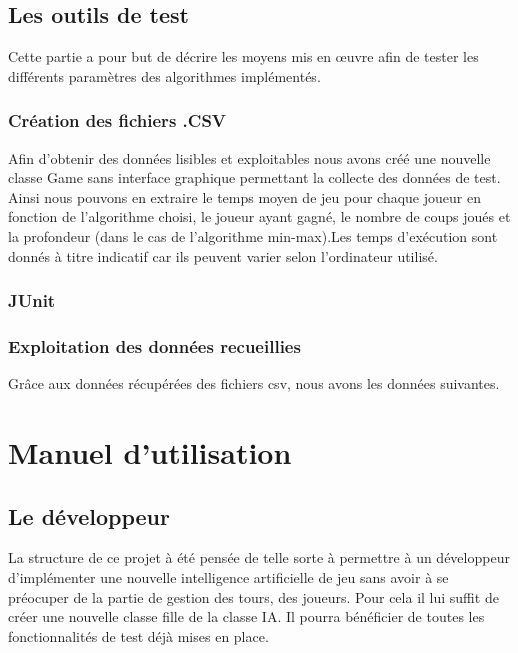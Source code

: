 \documentclass{report}
\begin{document}
	\chapter{Les outils de test}
	Cette partie a pour but de décrire les moyens mis en œuvre afin de tester les différents paramètres des algorithmes implémentés. 
	\section{Création des fichiers .CSV}
	\label{fichierCSV}
	Afin d'obtenir des données lisibles et exploitables nous avons créé une nouvelle classe Game sans interface graphique permettant la collecte des données de test. Ainsi nous pouvons en extraire le temps moyen de jeu pour chaque joueur en fonction de l'algorithme choisi, le joueur ayant gagné, le nombre de coups joués et la profondeur (dans le cas de l'algorithme min-max).Les temps d'exécution sont donnés à titre indicatif car ils peuvent varier selon l'ordinateur utilisé.
	\section{JUnit}
	
	\section{Exploitation des données recueillies}
	Grâce aux données récupérées des fichiers csv, nous avons les données suivantes.
	
	
	

\part{Manuel d'utilisation}
	\chapter{Le développeur}
	La structure de ce projet à été pensée de telle sorte à permettre à un développeur d'implémenter une nouvelle intelligence artificielle de jeu sans avoir à se préocuper de la partie de gestion des tours, des joueurs. Pour cela il lui suffit de créer une nouvelle classe fille de la classe IA. Il pourra bénéficier de toutes les fonctionnalités de test déjà mises en place.
	
\end{document}
